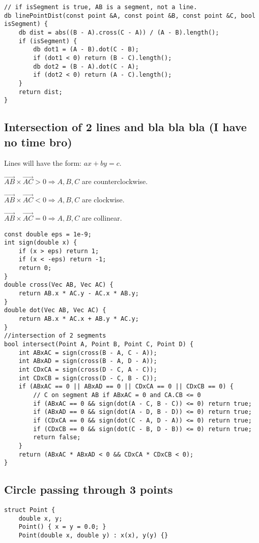 \documentclass[11pt,a4paper]{article}
\begin{document}
\begin{multicols*}{2}
\begin{lstlisting}
// if isSegment is true, AB is a segment, not a line.
db linePointDist(const point &A, const point &B, const point &C, bool isSegment) {
    db dist = abs((B - A).cross(C - A)) / (A - B).length();
    if (isSegment) {
        db dot1 = (A - B).dot(C - B);
        if (dot1 < 0) return (B - C).length();
        db dot2 = (B - A).dot(C - A);
        if (dot2 < 0) return (A - C).length();
    }
    return dist;
}
\end{lstlisting}

\subsection{Intersection of 2 lines and bla bla bla (I have no time bro)}
Lines will have the form: $ax + by = c$.

$\vec{AB} \times \vec{AC} > 0 \Rightarrow  A, B, C$ are counterclockwise.

$\vec{AB} \times \vec{AC} < 0 \Rightarrow  A, B, C$ are clockwise.

$\vec{AB} \times \vec{AC} = 0 \Rightarrow  A, B, C$ are collinear.

\begin{lstlisting}
const double eps = 1e-9;
int sign(double x) {
    if (x > eps) return 1;
    if (x < -eps) return -1;
    return 0;
}
double cross(Vec AB, Vec AC) {
    return AB.x * AC.y - AC.x * AB.y;
}
double dot(Vec AB, Vec AC) {
    return AB.x * AC.x + AB.y * AC.y;
}
//intersection of 2 segments
bool intersect(Point A, Point B, Point C, Point D) {
    int ABxAC = sign(cross(B - A, C - A));
    int ABxAD = sign(cross(B - A, D - A));
    int CDxCA = sign(cross(D - C, A - C));
    int CDxCB = sign(cross(D - C, B - C));
    if (ABxAC == 0 || ABxAD == 0 || CDxCA == 0 || CDxCB == 0) {
        // C on segment AB if ABxAC = 0 and CA.CB <= 0
        if (ABxAC == 0 && sign(dot(A - C, B - C)) <= 0) return true;
        if (ABxAD == 0 && sign(dot(A - D, B - D)) <= 0) return true;
        if (CDxCA == 0 && sign(dot(C - A, D - A)) <= 0) return true;
        if (CDxCB == 0 && sign(dot(C - B, D - B)) <= 0) return true;
        return false;
    }
    return (ABxAC * ABxAD < 0 && CDxCA * CDxCB < 0);
}
\end{lstlisting}

\subsection{Circle passing through 3 points}
\begin{lstlisting}
struct Point {
    double x, y;
    Point() { x = y = 0.0; }
    Point(double x, double y) : x(x), y(y) {}


\end{lstlisting}
\end{multicols*}
\end{document}
